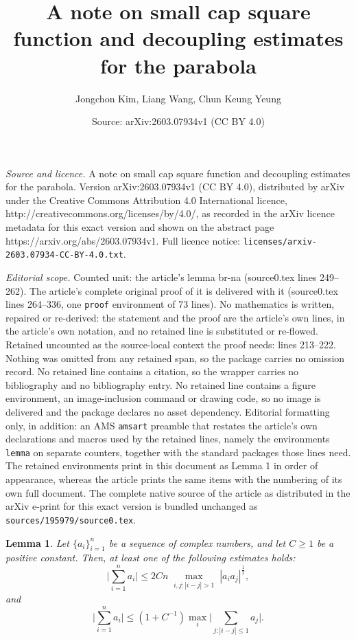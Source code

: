 \documentclass[10pt,a4paper]{amsart}
\title{A note on small cap square function and decoupling estimates for the parabola}
\author{Jongchon Kim, Liang Wang, Chun Keung Yeung}
\date{Source: arXiv:2603.07934v1 (CC BY 4.0)}
\newtheorem{lemma}{Lemma}
\begin{document}
\maketitle

\noindent\emph{Source and licence.} A note on small cap square function and decoupling estimates for the parabola. Version arXiv:2603.07934v1 (CC BY 4.0), distributed by arXiv under the Creative Commons Attribution 4.0 International licence, http://creativecommons.org/licenses/by/4.0/, as recorded in the arXiv licence metadata for this exact version and shown on the abstract page https://arxiv.org/abs/2603.07934v1. Full licence notice: \texttt{licenses/arxiv-2603.07934-CC-BY-4.0.txt}.\par\smallskip

\noindent\textit{Editorial scope.} Counted unit: the article's lemma br-na (source0.tex lines 249--262). The article's complete original proof of it is delivered with it (source0.tex lines 264--336, one \texttt{proof} environment of 73 lines). No mathematics is written, repaired or re-derived: the statement and the proof are the article's own lines, in the article's own notation, and no retained line is substituted or re-flowed.  Retained uncounted as the source-local context the proof needs: lines 213--222.  Nothing was omitted from any retained span, so the package carries no omission record.  No retained line contains a citation, so the wrapper carries no bibliography and no bibliography entry.  No retained line contains a figure environment, an image-inclusion command or drawing code, so no image is delivered and the package declares no asset dependency.  Editorial formatting only, in addition: an AMS \texttt{amsart} preamble that restates the article's own declarations and macros used by the retained lines, namely the environments \texttt{lemma} on separate counters, together with the standard packages those lines need.  The retained environments print in this document as Lemma 1 in order of appearance, whereas the article prints the same items with the numbering of its own full document.  The complete native source of the article as distributed in the arXiv e-print for this exact version is bundled unchanged as \texttt{sources/195979/source0.tex}.
\begin{lemma}\label{inarrow}
    Let $\{a_i\}_{i=1}^n$ be a sequence of complex numbers, and let $C\geq1$ be a positive constant. Then, at least one of the following estimates holds:
    \begin{equation}
        \bigg|\sum_{i=1}^n a_i\bigg|\leq 2C n \max_{\substack{i,j:|i-j|>1}}|a_ia_j|^{\frac{1}{2}},
    \end{equation}
    and
    \begin{equation}
        \bigg|\sum_{i=1}^n a_i\bigg|\leq \left(1+C^{-1}\right)\max_{i}\bigg|\sum_{j:|i-j|\leq1}a_j\bigg|.
    \end{equation}
\end{lemma}
\end{document}
